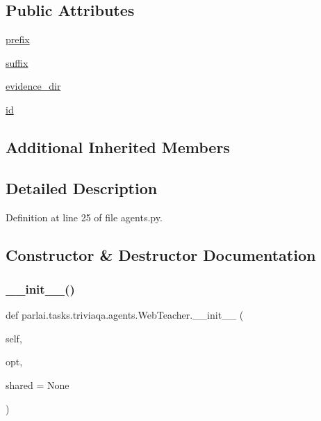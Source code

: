 \subsection*{Public Attributes}
\begin{DoxyCompactItemize}
\item 
\hyperlink{classparlai_1_1tasks_1_1triviaqa_1_1agents_1_1WebTeacher_ab62932f9cf9704abc101d924f279a8a1}{prefix}
\item 
\hyperlink{classparlai_1_1tasks_1_1triviaqa_1_1agents_1_1WebTeacher_adfa79e6153ab8900eff1853bba6def9c}{suffix}
\item 
\hyperlink{classparlai_1_1tasks_1_1triviaqa_1_1agents_1_1WebTeacher_a290c1e778391be704efed2dfe06bed25}{evidence\+\_\+dir}
\item 
\hyperlink{classparlai_1_1tasks_1_1triviaqa_1_1agents_1_1WebTeacher_aa997ce2a0c127b3cfc6391a0472fa9d3}{id}
\end{DoxyCompactItemize}
\subsection*{Additional Inherited Members}


\subsection{Detailed Description}


Definition at line 25 of file agents.\+py.



\subsection{Constructor \& Destructor Documentation}
\mbox{\label{classparlai_1_1tasks_1_1triviaqa_1_1agents_1_1WebTeacher_a13bb3abbde8cd219d61e2093d38f7210}} 
\subsubsection{\texorpdfstring{\+\_\+\+\_\+init\+\_\+\+\_\+()}{\_\_init\_\_()}}
{\footnotesize\ttfamily def parlai.\+tasks.\+triviaqa.\+agents.\+Web\+Teacher.\+\_\+\+\_\+init\+\_\+\+\_\+ (\begin{DoxyParamCaption}\item[{}]{self,  }\item[{}]{opt,  }\item[{}]{shared = {\ttfamily None} }\end{DoxyParamCaption})}



